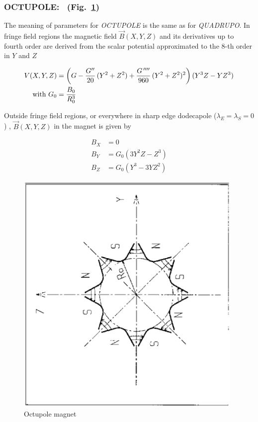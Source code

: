 \newpage

\subsubsection*{OCTUPOLE: \OCTUPOLETitl\  (Fig.~\protect\ref{fig24}) } \label{OCTUPOLE}

 The meaning of parameters for \textsl{OCTUPOLE}  is the same as for 
\textsl{QUADRUPO}.  In fringe field regions the magnetic field $ \vec  B(X,Y,Z)$ and 
its derivatives up to fourth order are derived from the scalar potential 
approximated to the 8-th order in $ Y $ and $ Z $

\begin{align*}
	V(X,Y,Z) &   =   \left(G-\dfrac{G^{\prime\prime} }{ 20} \, (Y^2+Z^2)+
	              \dfrac{G^{\,\prime\prime\prime\prime} }{ 960}\, (Y^2+Z^2)^2 \right) (Y^3Z-YZ^3)   \\
	\text{with } G_0 &   =  \dfrac{ B_0 }{ R^3_0} 
\end{align*}

\noindent Outside fringe field regions, or everywhere in sharp edge dodecapole
($ \lambda_ E=\lambda_ S=0$) , $ \vec  B(X,Y,Z) $ in the magnet is given by 

\begin{align*}
	B_X &   =   0 \\
	B_Y &   =   G_0(3Y^2Z-Z^3)  \\
	B_Z &   = G_0(Y^3-3YZ^2)    
\end{align*}
\vfill

\begin{figure}[H]
\centerline{\includegraphics[height=12cm,angle=-90]{Fig24.ps}}
\caption{\label{fig24}Octupole magnet}
\end{figure}
\vfill


